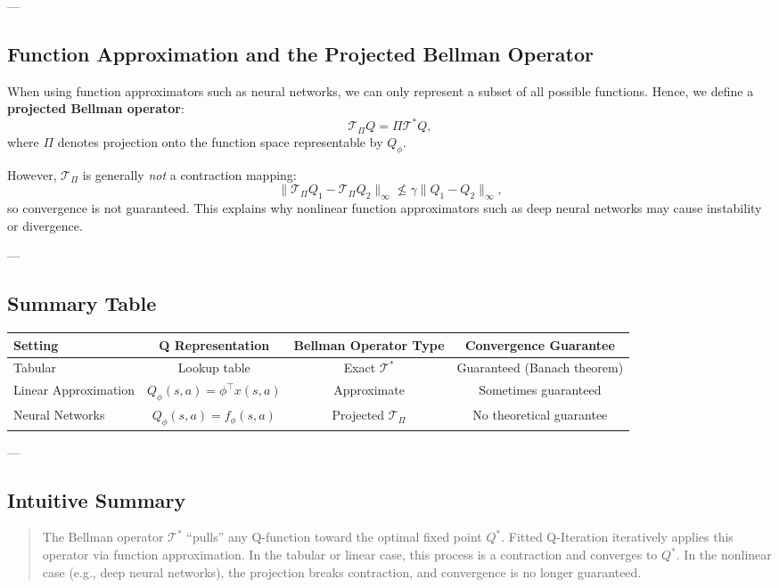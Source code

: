 \documentclass[12pt]{article}
\theoremstyle{definition} %
\theoremstyle{plain} %
\theoremstyle{remark} %
\begin{document}
\begin{CJK}{UTF8}{gbsn}
---

\subsection{Function Approximation and the Projected Bellman Operator}

When using function approximators such as neural networks, we can only represent a subset of all possible functions.  
Hence, we define a \textbf{projected Bellman operator}:
\[
\mathcal{T}_\Pi Q = \Pi \mathcal{T}^* Q,
\]
where \( \Pi \) denotes projection onto the function space representable by \( Q_\phi \).

However, \( \mathcal{T}_\Pi \) is generally \emph{not} a contraction mapping:
\[
\|\mathcal{T}_\Pi Q_1 - \mathcal{T}_\Pi Q_2\|_\infty \not\le \gamma \|Q_1 - Q_2\|_\infty,
\]
so convergence is not guaranteed. This explains why nonlinear function approximators such as deep neural networks may cause instability or divergence.

---

\subsection{Summary Table}

\begin{table}[h!]
\centering
\begin{tabular}{lccc}
\hline
\textbf{Setting} & \textbf{Q Representation} & \textbf{Bellman Operator Type} & \textbf{Convergence Guarantee} \\
\hline
Tabular & Lookup table & Exact \( \mathcal{T}^* \) & Guaranteed (Banach theorem) \\
Linear Approximation & \( Q_\phi(s,a) = \phi^\top x(s,a) \) & Approximate & Sometimes guaranteed \\
Neural Networks & \( Q_\phi(s,a) = f_\phi(s,a) \) & Projected \( \mathcal{T}_\Pi \) & No theoretical guarantee \\
\hline
\end{tabular}
\end{table}

---

\subsection{Intuitive Summary}

\begin{quote}
The Bellman operator \( \mathcal{T}^* \) ``pulls'' any Q-function toward the optimal fixed point \( Q^* \).
Fitted Q-Iteration iteratively applies this operator via function approximation.
In the tabular or linear case, this process is a contraction and converges to \( Q^* \).
In the nonlinear case (e.g., deep neural networks), the projection breaks contraction,
and convergence is no longer guaranteed.
\end{quote}


\end{CJK}
\end{document}
